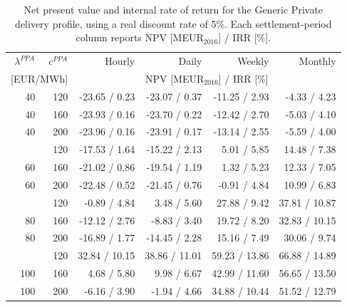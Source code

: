 \begin{table}[H]
\centering
\small
\caption{Net present value and internal rate of return for the Generic Private delivery profile, using a real discount rate of 5\%. Each settlement-period column reports NPV [MEUR$_{2016}$] / IRR [\%].}
\label{tab:npv_irr_generic_private}
\begin{tabular*}{\textwidth}{@{\extracolsep{\fill}}rrrrrr@{}}
\toprule
$\lambda^{PPA}$ & $c^{PPA}$ & Hourly & Daily & Weekly & Monthly \\
\multicolumn{2}{c}{[EUR/MWh]} & \multicolumn{4}{c}{NPV [MEUR$_{2016}$] / IRR [\%]} \\
\midrule
40 & 120 & -23.65 / 0.23 & -23.07 / 0.37 & -11.25 / 2.93 & -4.33 / 4.23 \\
40 & 160 & -23.93 / 0.16 & -23.70 / 0.22 & -12.42 / 2.70 & -5.03 / 4.10 \\
40 & 200 & -23.96 / 0.16 & -23.91 / 0.17 & -13.14 / 2.55 & -5.59 / 4.00 \\
\addlinespace
60 & 120 & -17.53 / 1.64 & -15.22 / 2.13 & 5.01 / 5.85 & 14.48 / 7.38 \\
60 & 160 & -21.02 / 0.86 & -19.54 / 1.19 & 1.32 / 5.23 & 12.33 / 7.05 \\
60 & 200 & -22.48 / 0.52 & -21.45 / 0.76 & -0.91 / 4.84 & 10.99 / 6.83 \\
\addlinespace
80 & 120 & -0.89 / 4.84 & 3.48 / 5.60 & 27.88 / 9.42 & 37.81 / 10.87 \\
80 & 160 & -12.12 / 2.76 & -8.83 / 3.40 & 19.72 / 8.20 & 32.83 / 10.15 \\
80 & 200 & -16.89 / 1.77 & -14.45 / 2.28 & 15.16 / 7.49 & 30.06 / 9.74 \\
\addlinespace
100 & 120 & 32.84 / 10.15 & 38.86 / 11.01 & 59.23 / 13.86 & 66.88 / 14.89 \\
100 & 160 & 4.68 / 5.80 & 9.98 / 6.67 & 42.99 / 11.60 & 56.65 / 13.50 \\
100 & 200 & -6.16 / 3.90 & -1.94 / 4.66 & 34.88 / 10.44 & 51.52 / 12.79 \\
\bottomrule
\end{tabular*}
\end{table}

